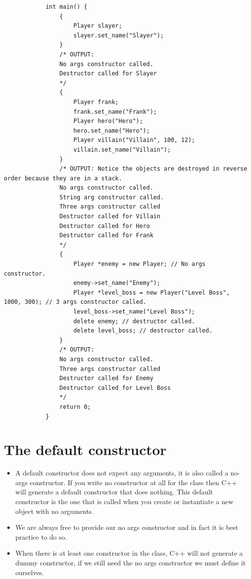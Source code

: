 \begin{itemize}
\begin{verbatim}
            int main() {
                {
                    Player slayer;
                    slayer.set_name("Slayer");
                }
                /* OUTPUT:
                No args constructor called.
                Destructor called for Slayer
                */
                {
                    Player frank;
                    frank.set_name("Frank");
                    Player hero("Hero");
                    hero.set_name("Hero");
                    Player villain("Villain", 100, 12);
                    villain.set_name("Villain");
                }
                /* OUTPUT: Notice the objects are destroyed in reverse order because they are in a stack.
                No args constructor called.
                String arg constructor called.
                Three args constructor called
                Destructor called for Villain
                Destructor called for Hero
                Destructor called for Frank
                */
                {
                    Player *enemy = new Player; // No args constructor.
                    enemy->set_name("Enemy");
                    Player *level_boss = new Player("Level Boss", 1000, 300); // 3 args constructor called.
                    level_boss->set_name("Level Boss");
                    delete enemy; // destructor called.
                    delete level_boss; // destructor called.
                }
                /* OUTPUT:
                No args constructor called.
                Three args constructor called
                Destructor called for Enemy
                Destructor called for Level Boss
                */
                return 0;
            }
        \end{verbatim}
\end{itemize}


\section{The default constructor}
\begin{itemize}
    \item A default constructor does not expect any arguments, it is also called a no-args constructor. If you write no constructor at all for the class then C++ will generate a default constructor that does nothing. This default constructor is the one that is called when you create or instantiate a new object with no arguments.
    \item We are always free to provide our no args constructor and in fact it is best practice to do so.
    \item When there is at least one constructor in the class, C++ will not generate a dummy constructor, if we still need the no args constructor we must define it ourselves.
\end{itemize}

